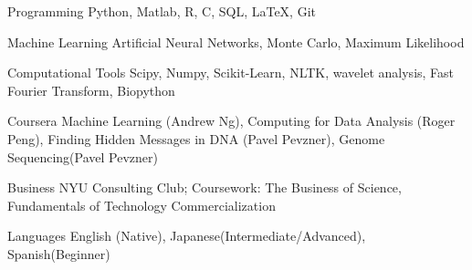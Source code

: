 


\begin{cvskills}


\cvskill
{Programming} %
{Python, Matlab, R, C, SQL, LaTeX, Git}



\cvskill
{Machine Learning} %
{Artificial Neural Networks, Monte Carlo, Maximum Likelihood} %

\cvskill
{Computational Tools} %
{Scipy, Numpy, Scikit-Learn, NLTK, wavelet analysis, Fast Fourier Transform, Biopython} %

\cvskill
{Coursera} %
{Machine Learning (Andrew Ng), Computing for Data Analysis (Roger Peng), Finding Hidden Messages in DNA (Pavel Pevzner), Genome Sequencing(Pavel Pevzner)} %

\cvskill
{Business} %
{NYU Consulting Club; Coursework: The Business of Science, Fundamentals of Technology Commercialization}%



\cvskill
{Languages} %
{English (Native), Japanese(Intermediate/Advanced), Spanish(Beginner)} %


\end{cvskills}
